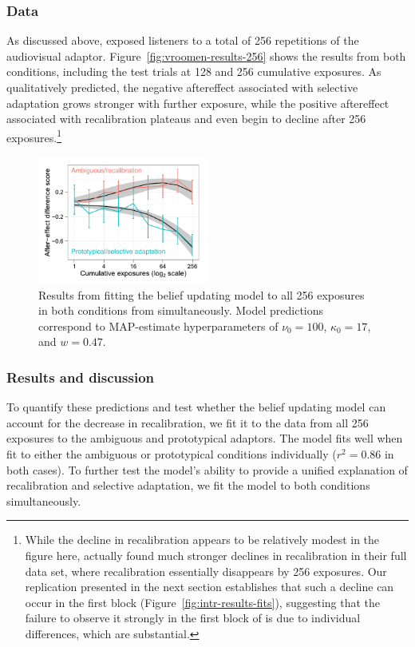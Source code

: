 \subsubsection{Data}
As discussed above, \textcite{Vroomen2007} exposed listeners to a total of 256 repetitions of the audiovisual adaptor.  Figure~\ref{fig:vroomen-results-256} shows the results from both conditions, including the test trials at 128 and 256 cumulative exposures.  As qualitatively predicted, the negative aftereffect associated with selective adaptation grows stronger with further exposure, while the positive aftereffect associated with recalibration plateaus and even begin to decline after 256 exposures.\footnote{While the decline in recalibration appears to be relatively modest in the figure here, \protect\textcite{Vroomen2007} actually found much stronger declines in recalibration in their full data set, where recalibration essentially disappears by 256 exposures.  Our replication presented in the next section establishes that such a decline can occur in the first block (Figure~\ref{fig:intr-results-fits}), suggesting that the failure to observe it strongly in the first block of \protect\textcite{Vroomen2007} is due to individual differences, which are substantial.}

\begin{figure}[htb]
  \centering
  \includegraphics[width=0.5\textwidth]{vroomen-preds-firstblock.pdf}
  \caption{Results from fitting the belief updating model to all 256 exposures in both conditions from \protect\textcite{Vroomen2007} simultaneously.  Model predictions correspond to MAP-estimate hyperparameters of $\nu_0 = 100$, $\kappa_0=17$, and $w=0.47$.}
  \label{fig:model-fits-vroomen-256-simult}
\end{figure}

\subsubsection{Results and discussion}
To quantify these predictions and test whether the belief updating model can account for the decrease in recalibration, we fit it to the data from all 256 exposures to the ambiguous and prototypical adaptors.
The model fits well when fit to either the ambiguous or prototypical conditions individually ($r^2=0.86$ in both cases). To further test the model's ability to provide a unified explanation of recalibration and selective adaptation, we fit the model to both conditions simultaneously.

